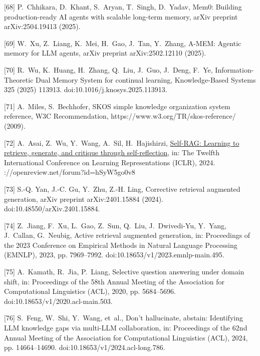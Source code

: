 \documentclass[11pt]{article}
\begin{document}
[68] 
P.~Chhikara, D.~Khant, S.~Aryan, T.~Singh, D.~Yadav, Mem0: Building
  production-ready {AI} agents with scalable long-term memory, arXiv preprint
  arXiv:2504.19413 (2025).



[69] 
W.~Xu, Z.~Liang, K.~Mei, H.~Gao, J.~Tan, Y.~Zhang, {A-MEM}: Agentic memory for
  {LLM} agents, arXiv preprint arXiv:2502.12110 (2025).



[70] 
R.~Wu, K.~Huang, H.~Zhang, Q.~Liu, J.~Guo, J.~Deng, F.~Ye,
  {Information-Theoretic Dual Memory System for continual learning},
  Knowledge-Based Systems 325 (2025) 113913.
  doi:10.1016/j.knosys.2025.113913.



[71] 
A.~Miles, S.~Bechhofer, {SKOS} simple knowledge organization system reference,
  W3C Recommendation, https://www.w3.org/TR/skos-reference/ (2009).



[72] 
A.~Asai, Z.~Wu, Y.~Wang, A.~Sil, H.~Hajishirzi,
  \href{https://openreview.net/forum?id=hSyW5go0v8}{{Self-RAG}: Learning to
  retrieve, generate, and critique through self-reflection}, in: The Twelfth
  International Conference on Learning Representations ({ICLR}), 2024.
\newlinehttps://openreview.net/forum?id=hSyW5go0v8



[73] 
S.-Q. Yan, J.-C. Gu, Y.~Zhu, Z.-H. Ling, Corrective retrieval augmented
  generation, arXiv preprint arXiv:2401.15884 (2024).
  doi:10.48550/arXiv.2401.15884.



[74] 
Z.~Jiang, F.~Xu, L.~Gao, Z.~Sun, Q.~Liu, J.~Dwivedi-Yu, Y.~Yang, J.~Callan,
  G.~Neubig, Active retrieval augmented generation, in: Proceedings of the 2023
  Conference on Empirical Methods in Natural Language Processing ({EMNLP}),
  2023, pp. 7969--7992.
  doi:10.18653/v1/2023.emnlp-main.495.



[75] 
A.~Kamath, R.~Jia, P.~Liang, Selective question answering under domain shift,
  in: Proceedings of the 58th Annual Meeting of the Association for
  Computational Linguistics ({ACL}), 2020, pp. 5684--5696.
  doi:10.18653/v1/2020.acl-main.503.



[76] 
S.~Feng, W.~Shi, Y.~Wang, et~al., Don't hallucinate, abstain: Identifying {LLM}
  knowledge gaps via multi-{LLM} collaboration, in: Proceedings of the 62nd
  Annual Meeting of the Association for Computational Linguistics (ACL), 2024,
  pp. 14664--14690.
  doi:10.18653/v1/2024.acl-long.786.
\end{document}
